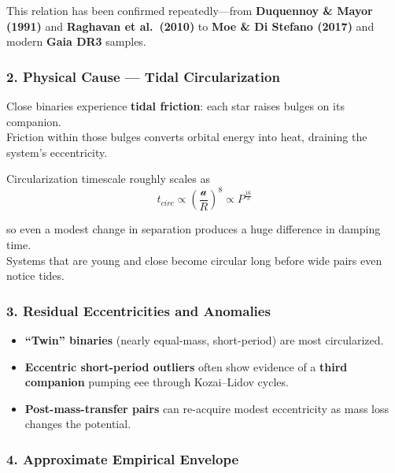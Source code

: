 \documentclass[
  letterpaper,
]{book}
\providecommand{\tightlist}{%
  \setlength{\itemsep}{0pt}\setlength{\parskip}{0pt}}
\begin{document}
This relation has been confirmed repeatedly---from \textbf{Duquennoy \&
Mayor (1991)} and \textbf{Raghavan et al.~(2010)} to \textbf{Moe \& Di
Stefano (2017)} and modern \textbf{Gaia DR3} samples.

\subsubsection{\texorpdfstring{2. \textbf{Physical Cause --- Tidal
Circularization}}{2. Physical Cause --- Tidal Circularization}}\label{physical-cause-tidal-circularization}

Close binaries experience \textbf{tidal friction}: each star raises
bulges on its companion.\\
Friction within those bulges converts orbital energy into heat, draining
the system's eccentricity.

Circularization timescale roughly scales as \[
t_{circ} \propto \left(\frac{\mathcal{a}}{R}\right)^8 \propto P^{\frac{16}{3}}
\]

so even a modest change in separation produces a huge difference in
damping time.\\
Systems that are young and close become circular long before wide pairs
even notice tides.

\subsubsection{\texorpdfstring{3. \textbf{Residual Eccentricities and
Anomalies}}{3. Residual Eccentricities and Anomalies}}\label{residual-eccentricities-and-anomalies}

\begin{itemize}
\tightlist
\item
  \textbf{``Twin'' binaries} (nearly equal-mass, short-period) are most
  circularized.\\
\item
  \textbf{Eccentric short-period outliers} often show evidence of a
  \textbf{third companion} pumping eee through Kozai--Lidov cycles.\\
\item
  \textbf{Post-mass-transfer pairs} can re-acquire modest eccentricity
  as mass loss changes the potential.
\end{itemize}

\subsubsection{\texorpdfstring{4. \textbf{Approximate Empirical
Envelope}}{4. Approximate Empirical Envelope}}\label{approximate-empirical-envelope}
\end{document}
